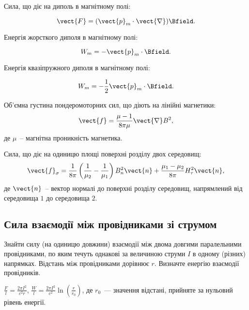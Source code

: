\begin{Theory}
Сила, що діє на диполь в магнітному полі:

\begin{equation}
	\vect{F} = (\vect{p}_m\cdot\vect{\nabla})\Bfield.
\end{equation}

Енергія жорсткого диполя в магнітному полі:

\begin{equation}
	W_m = -\vect{p}_m\cdot\Bfield.
\end{equation}

Енергія квазіпружного диполя в магнітному полі:

\begin{equation}
	W_m = -\frac12 \vect{p}_m\cdot\Bfield.
\end{equation}

Об'ємна густина пондеромоторних сил, що діють на лінійні магнетики:
\begin{equation}
	\vect{f}  = \frac{\mu - 1}{8\pi\mu}\vect{\nabla}B^2,
\end{equation}
де $\mu$~-- магнітна проникність магнетика.

Сила, що діє на одиницю площі поверхні розділу двох середовищ:
\begin{equation}
	\vect{f}_{\sigma} = \frac{1}{8\pi}\left( \frac{1}{\mu_2} - \frac{1}{\mu_1} \right) B^2_n\vect{n} + \frac{\mu_1 - \mu_2}{8\pi} H^2_{\tau}\vect{n},
\end{equation}
де $\vect{n}$~-- вектор нормалі до поверхні розділу середовищ, напрямлений від середовища $1$ до середовища $2$.
\end{Theory}

\subsection*{Сила взаємодії між провідниками зі струмом}

\begin{problem}
    Знайти силу (на одиницю довжини) взаємодії між двома довгими паралельними провідниками, по яким течуть однакові за величиною струми $I$ в одному (різних) напрямках.  Відстань між провідниками дорівнює $r$.  Визначте енергію взаємодії провідників.
\begin{solution}
	$\frac{F}{l} = \frac{2\pi I^2}{c^2r}$,
	$\frac{W}{l} = \frac{2\pi I^2}{c^2}\ln \left( \frac{r}{r_0}\right) $, де $r_0$~--- значення відстані, прийняте за нульовий рівень енергії.
\end{solution}
\end{problem}


